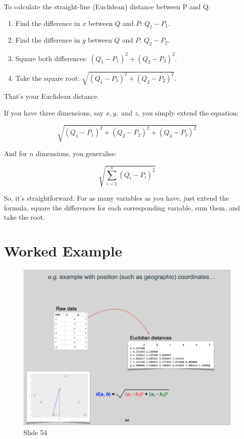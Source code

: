 \documentclass[
  10pt,
]{book}
\providecommand{\tightlist}{%
  \setlength{\itemsep}{0pt}\setlength{\parskip}{0pt}}
\begin{document}
To calculate the straight-line (Euclidean) distance between P and Q:

\begin{enumerate}
\def\labelenumi{\arabic{enumi}.}
\tightlist
\item
  Find the difference in \(x\) between \(Q\) and \(P\): \(Q_1 - P_1\).
\item
  Find the difference in \(y\) between \(Q\) and \(P\): \(Q_2 - P_2\).
\item
  Square both differences: \((Q_1 - P_1)^2 + (Q_2 - P_2)^2\).
\item
  Take the square root: \(\sqrt{(Q_1 - P_1)^2 + (Q_2 - P_2)^2}\).
\end{enumerate}

That's your Euclidean distance.

If you have three dimensions, say \(x, y,\) and \(z\), you simply extend
the equation:

\[
\sqrt{(Q_1 - P_1)^2 + (Q_2 - P_2)^2 + (Q_3 - P_3)^2}
\]

And for \(n\) dimensions, you generalise:

\[
\sqrt{\sum_{i=1}^{n} (Q_i - P_i)^2}
\]

So, it's straightforward. For as many variables as you have, just extend
the formula, square the differences for each corresponding variable, sum
them, and take the root.

\section{Worked Example}\label{worked-example}

\begin{figure}[ht]
\centering
\includegraphics[width=0.8\linewidth]{../images/BDC334/BDC334-054.jpeg}
\caption*{Slide 54}
\end{figure}
\end{document}

